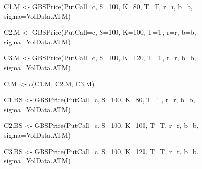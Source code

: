 \documentclass[
]{article}
\newenvironment{Shaded}{\begin{snugshade}}{\end{snugshade}}
\newcommand{\AttributeTok}[1]{\textcolor[rgb]{0.77,0.63,0.00}{#1}}
\newcommand{\DecValTok}[1]{\textcolor[rgb]{0.00,0.00,0.81}{#1}}
\newcommand{\FunctionTok}[1]{\textcolor[rgb]{0.00,0.00,0.00}{#1}}
\newcommand{\NormalTok}[1]{#1}
\newcommand{\OtherTok}[1]{\textcolor[rgb]{0.56,0.35,0.01}{#1}}
\newcommand{\StringTok}[1]{\textcolor[rgb]{0.31,0.60,0.02}{#1}}
\begin{document}
\begin{Shaded}
\begin{Highlighting}[]
\NormalTok{C1.M }\OtherTok{\textless{}{-}} \FunctionTok{GBSPrice}\NormalTok{(}\AttributeTok{PutCall=}\StringTok{\textquotesingle{}c\textquotesingle{}}\NormalTok{, }\AttributeTok{S=}\DecValTok{100}\NormalTok{, }\AttributeTok{K=}\DecValTok{80}\NormalTok{, }\AttributeTok{T=}\NormalTok{T, }\AttributeTok{r=}\NormalTok{r, }\AttributeTok{b=}\NormalTok{b, }\AttributeTok{sigma=}\NormalTok{VolData.ATM)}

\NormalTok{C2.M }\OtherTok{\textless{}{-}} \FunctionTok{GBSPrice}\NormalTok{(}\AttributeTok{PutCall=}\StringTok{\textquotesingle{}c\textquotesingle{}}\NormalTok{, }\AttributeTok{S=}\DecValTok{100}\NormalTok{, }\AttributeTok{K=}\DecValTok{100}\NormalTok{, }\AttributeTok{T=}\NormalTok{T, }\AttributeTok{r=}\NormalTok{r, }\AttributeTok{b=}\NormalTok{b, }\AttributeTok{sigma=}\NormalTok{VolData.ATM)}

\NormalTok{C3.M }\OtherTok{\textless{}{-}} \FunctionTok{GBSPrice}\NormalTok{(}\AttributeTok{PutCall=}\StringTok{\textquotesingle{}c\textquotesingle{}}\NormalTok{, }\AttributeTok{S=}\DecValTok{100}\NormalTok{, }\AttributeTok{K=}\DecValTok{120}\NormalTok{, }\AttributeTok{T=}\NormalTok{T, }\AttributeTok{r=}\NormalTok{r, }\AttributeTok{b=}\NormalTok{b, }\AttributeTok{sigma=}\NormalTok{VolData.ATM)}

\NormalTok{C.M }\OtherTok{\textless{}{-}} \FunctionTok{c}\NormalTok{(C1.M, C2.M, C3.M)}

\NormalTok{C1.BS }\OtherTok{\textless{}{-}} \FunctionTok{GBSPrice}\NormalTok{(}\AttributeTok{PutCall=}\StringTok{\textquotesingle{}c\textquotesingle{}}\NormalTok{, }\AttributeTok{S=}\DecValTok{100}\NormalTok{, }\AttributeTok{K=}\DecValTok{80}\NormalTok{, }\AttributeTok{T=}\NormalTok{T, }\AttributeTok{r=}\NormalTok{r, }\AttributeTok{b=}\NormalTok{b, }\AttributeTok{sigma=}\NormalTok{VolData.ATM)}

\NormalTok{C2.BS }\OtherTok{\textless{}{-}} \FunctionTok{GBSPrice}\NormalTok{(}\AttributeTok{PutCall=}\StringTok{\textquotesingle{}c\textquotesingle{}}\NormalTok{, }\AttributeTok{S=}\DecValTok{100}\NormalTok{, }\AttributeTok{K=}\DecValTok{100}\NormalTok{, }\AttributeTok{T=}\NormalTok{T, }\AttributeTok{r=}\NormalTok{r, }\AttributeTok{b=}\NormalTok{b, }\AttributeTok{sigma=}\NormalTok{VolData.ATM)}

\NormalTok{C3.BS }\OtherTok{\textless{}{-}} \FunctionTok{GBSPrice}\NormalTok{(}\AttributeTok{PutCall=}\StringTok{\textquotesingle{}c\textquotesingle{}}\NormalTok{, }\AttributeTok{S=}\DecValTok{100}\NormalTok{, }\AttributeTok{K=}\DecValTok{120}\NormalTok{, }\AttributeTok{T=}\NormalTok{T, }\AttributeTok{r=}\NormalTok{r, }\AttributeTok{b=}\NormalTok{b, }\AttributeTok{sigma=}\NormalTok{VolData.ATM)}


\end{Highlighting}
\end{Shaded}
\end{document}

